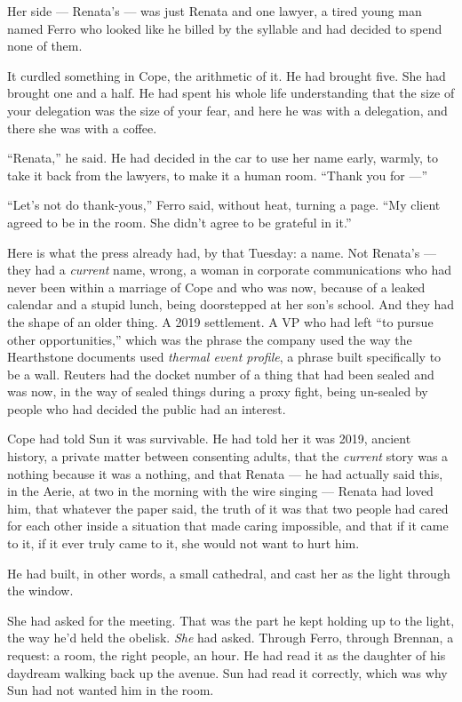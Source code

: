 \documentclass[11pt,openany]{book}
\newcommand{\scenebreak}{\par\vspace{0.5\baselineskip}\begin{center}\textasteriskcentered\quad\textasteriskcentered\quad\textasteriskcentered\end{center}\vspace{0.5\baselineskip}\par}
\begin{document}
Her side --- Renata's --- was just Renata and one lawyer, a tired young man named Ferro who looked like he billed by the syllable and had decided to spend none of them.

It curdled something in Cope, the arithmetic of it. He had brought five. She had brought one and a half. He had spent his whole life understanding that the size of your delegation was the size of your fear, and here he was with a delegation, and there she was with a coffee.

``Renata,'' he said. He had decided in the car to use her name early, warmly, to take it back from the lawyers, to make it a human room. ``Thank you for ---''

``Let's not do thank-yous,'' Ferro said, without heat, turning a page. ``My client agreed to be in the room. She didn't agree to be grateful in it.''


\scenebreak


Here is what the press already had, by that Tuesday: a name. Not Renata's --- they had a \textit{current} name, wrong, a woman in corporate communications who had never been within a marriage of Cope and who was now, because of a leaked calendar and a stupid lunch, being doorstepped at her son's school. And they had the shape of an older thing. A 2019 settlement. A VP who had left ``to pursue other opportunities,'' which was the phrase the company used the way the Hearthstone documents used \textit{thermal event profile}, a phrase built specifically to be a wall. Reuters had the docket number of a thing that had been sealed and was now, in the way of sealed things during a proxy fight, being un-sealed by people who had decided the public had an interest.

Cope had told Sun it was survivable. He had told her it was 2019, ancient history, a private matter between consenting adults, that the \textit{current} story was a nothing because it was a nothing, and that Renata --- he had actually said this, in the Aerie, at two in the morning with the wire singing --- Renata had loved him, that whatever the paper said, the truth of it was that two people had cared for each other inside a situation that made caring impossible, and that if it came to it, if it ever truly came to it, she would not want to hurt him.

He had built, in other words, a small cathedral, and cast her as the light through the window.

She had asked for the meeting. That was the part he kept holding up to the light, the way he'd held the obelisk. \textit{She} had asked. Through Ferro, through Brennan, a request: a room, the right people, an hour. He had read it as the daughter of his daydream walking back up the avenue. Sun had read it correctly, which was why Sun had not wanted him in the room.
\end{document}
